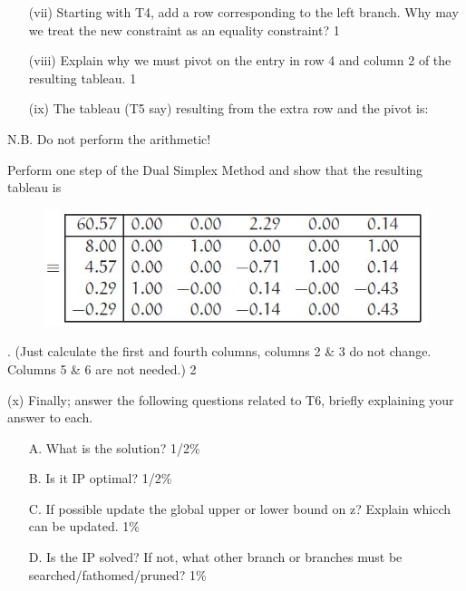 \documentclass{beamer}
\begin{document}
\begin{frame}
\begin{frame}
\end{frame}
\begin{frame}
\begin{itemize}
\item[(vii)] Starting with T4, add a row corresponding to the left branch. Why
may we treat the new constraint as an equality constraint? 1%
\item[(viii)] Explain why we must pivot on the entry in row 4 and column 2 of
the resulting tableau. 1%
\item[(ix)] The tableau (T5 say) resulting from the extra row and the pivot is:
\end{itemize}

N.B. Do not perform the arithmetic!


\end{frame}
\begin{frame}
Perform one step of the Dual Simplex Method and show that the
resulting tableau is \begin{figure}
\centering
\includegraphics[width=0.7\linewidth]{Exam14-i}
\caption{}
\label{fig:Exam14-i}
\end{figure}

.
(Just calculate the first and fourth columns, columns 2 \& 3 do
not change. Columns 5 \& 6 are not needed.) 2%
\end{frame}
\begin{frame}
(x) Finally; answer the following questions related to T6, briefly explaining your answer to each.
\begin{itemize}
\item[A.] What is the solution? 1/2\%
\item[B.] Is it IP optimal? 1/2\%
\item[C.] If possible update the global upper or lower bound on z? Explain
whicch can be updated. 1\%
\item[D.] Is the IP solved? If not, what other branch or branches must
be searched/fathomed/pruned? 1\%
\end{itemize}

\end{frame}

\end{document}

